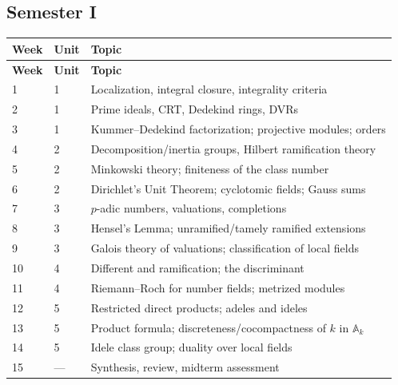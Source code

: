 \documentclass[11pt]{article}
\begin{document}
\subsection*{Semester I}
\begin{longtable}{@{}C{1.3cm} C{1.3cm} L{11cm}@{}}
\toprule
\textbf{Week} & \textbf{Unit} & \textbf{Topic} \\
\midrule
\endfirsthead
\toprule
\textbf{Week} & \textbf{Unit} & \textbf{Topic} \\
\midrule
{} & 1 & Localization, integral closure, integrality criteria \\
2 & 1 & Prime ideals, CRT, Dedekind rings, DVRs \\
3 & 1 & Kummer--Dedekind factorization; projective modules; orders \\
4 & 2 & Decomposition/inertia groups, Hilbert ramification theory \\
5 & 2 & Minkowski theory; finiteness of the class number \\
6 & 2 & Dirichlet's Unit Theorem; cyclotomic fields; Gauss sums \\
7 & 3 & $p$-adic numbers, valuations, completions \\
8 & 3 & Hensel's Lemma; unramified/tamely ramified extensions \\
9 & 3 & Galois theory of valuations; classification of local fields \\
10 & 4 & Different and ramification; the discriminant \\
11 & 4 & Riemann--Roch for number fields; metrized modules \\
12 & 5 & Restricted direct products; adeles and ideles \\
13 & 5 & Product formula; discreteness/cocompactness of $k$ in $\mathbb{A}_k$ \\
14 & 5 & Idele class group; duality over local fields \\
15 & --- & Synthesis, review, midterm assessment \\
\bottomrule
\end{longtable}
\end{document}
